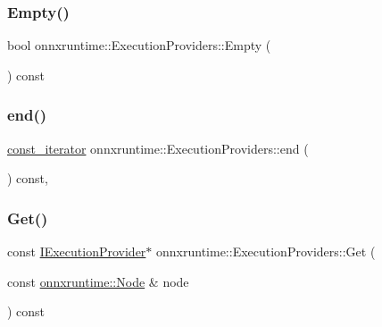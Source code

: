 \subsubsection{\texorpdfstring{Empty()}{Empty()}}
{\footnotesize\ttfamily bool onnxruntime\+::\+Execution\+Providers\+::\+Empty (\begin{DoxyParamCaption}{ }\end{DoxyParamCaption}) const\hspace{0.3cm}{\ttfamily [inline]}}

\mbox{\label{classonnxruntime_1_1ExecutionProviders_a7ef8bcdee18b9ff7e59141171cb79ed3}} 
\subsubsection{\texorpdfstring{end()}{end()}}
{\footnotesize\ttfamily \mbox{\hyperlink{classonnxruntime_1_1ExecutionProviders_a2eb06c44e805e428aa26b1bfe12348fb}{const\+\_\+iterator}} onnxruntime\+::\+Execution\+Providers\+::end (\begin{DoxyParamCaption}{ }\end{DoxyParamCaption}) const\hspace{0.3cm}{\ttfamily [inline]}, {\ttfamily [noexcept]}}

\mbox{\label{classonnxruntime_1_1ExecutionProviders_a41c2494ae4373f44ebf8f98f83e293cc}} 
\subsubsection{\texorpdfstring{Get()}{Get()}\hspace{0.1cm}{\footnotesize\ttfamily [1/3]}}
{\footnotesize\ttfamily const \mbox{\hyperlink{classonnxruntime_1_1IExecutionProvider}{I\+Execution\+Provider}}$\ast$ onnxruntime\+::\+Execution\+Providers\+::\+Get (\begin{DoxyParamCaption}\item[{const \mbox{\hyperlink{classonnxruntime_1_1Node}{onnxruntime\+::\+Node}} \&}]{node }\end{DoxyParamCaption}) const\hspace{0.3cm}{\ttfamily [inline]}}

